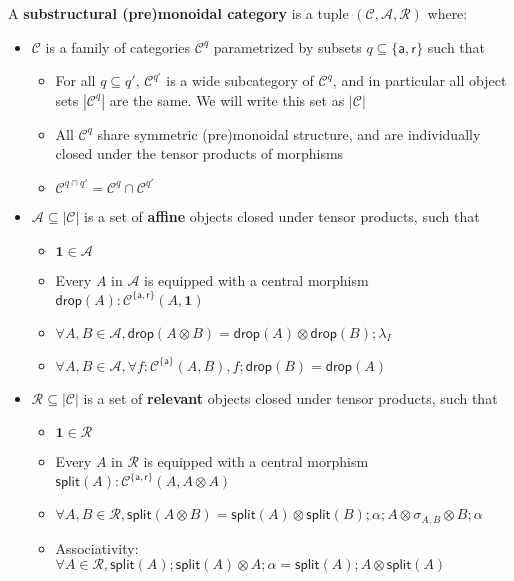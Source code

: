 \documentclass[acmsmall,screen,review]{acmart}
\newcommand{\mc}[1]{\ensuremath{\mathcal{#1}}}
\newcommand{\mb}[1]{\ensuremath{\mathbf{#1}}}
\newcommand{\ms}[1]{\ensuremath{\mathsf{#1}}}
\begin{document}
\begin{definition}
  A \textbf{substructural (pre)monoidal category} is a tuple \((\mc{C}, \mc{A}, \mc{R})\) where:
  \begin{itemize}
    \item \(\mc{C}\) is a family of categories \(\mc{C}^q\) parametrized by subsets \(q \subseteq \{\ms{a}, \ms{r}\}\) such that
    \begin{itemize}
      \item For all \(q \subseteq q'\), \(\mc{C}^{q'}\) is a wide subcategory of \(\mc{C}^q\), and in particular all object sets \(|\mc{C}^q|\) are the same. We will write this set as \(|\mc{C}|\)
      \item All \(\mc{C}^q\) share symmetric (pre)monoidal structure, and are individually closed under the tensor products of morphisms
      \item \(\mc{C}^{q \cap q'} = \mc{C}^q \cap \mc{C}^{q'}\)
    \end{itemize}
    \item \(\mc{A} \subseteq |\mc{C}|\) is a set of \textbf{affine} objects closed under tensor products, such that
    \begin{itemize}
      \item \(\mb{1} \in \mc{A}\)
      \item Every \(A\) in \(\mc{A}\) is equipped with a central morphism \(\ms{drop}(A): \mc{C}^{\{\ms{a}, \ms{r}\}}(A, \mb{1})\)
      \item \(\forall A, B \in \mc{A}, \ms{drop}(A \otimes B) = \ms{drop}(A) \otimes \ms{drop}(B);\lambda_I\)
      \item \(\forall A, B \in \mc{A}, \forall f: \mc{C}^{\{\ms{a}\}}(A, B), f;\ms{drop}(B) = \ms{drop}(A)\)
    \end{itemize}
    \item \(\mc{R} \subseteq |\mc{C}|\) is a set of \textbf{relevant} objects closed under tensor products, such that
    \begin{itemize}
      \item \(\mb{1} \in \mc{R}\)
      \item Every \(A\) in \(\mc{R}\) is equipped with a central morphism \(\ms{split}(A): \mc{C}^{\{\ms{a}, \ms{r}\}}(A, A \otimes A)\)
      \item \(\forall A, B \in \mc{R}, \ms{split}(A \otimes B) = \ms{split}(A) \otimes \ms{split}(B);\alpha;A \otimes \sigma_{A, B} \otimes B;\alpha\)
      \item Associativity: \(\forall A \in \mc{R}, \ms{split}(A);\ms{split}(A) \otimes A;\alpha = \ms{split}(A);A \otimes \ms{split}(A)\)

\end{itemize}
\end{itemize}
\end{definition}
\end{document}
